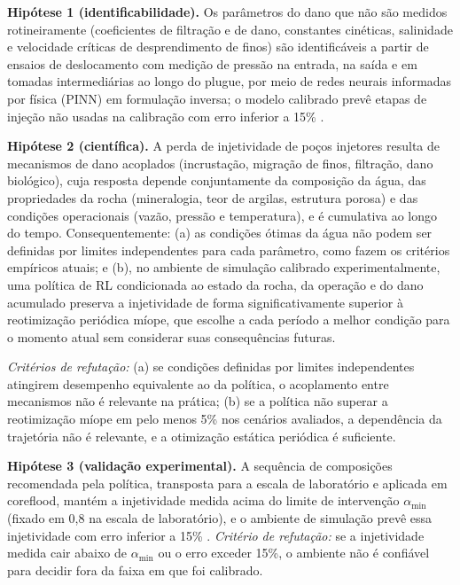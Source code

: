 \documentclass[10pt,a4paper]{article}
\begin{document}
\textbf{Hipótese 1 (identificabilidade).} Os parâmetros do dano que não são medidos rotineiramente
(coeficientes de filtração e de dano, constantes cinéticas, salinidade e velocidade
críticas de desprendimento de finos) são identificáveis a partir de ensaios de
deslocamento com medição de pressão na entrada, na saída e em tomadas intermediárias ao
longo do plugue, por meio de redes neurais informadas por física (PINN) em formulação inversa; o modelo
calibrado prevê etapas de injeção não usadas na calibração com erro inferior a 15\% \cite{bulau1997}.

\textbf{Hipótese 2 (científica).} A perda de injetividade de poços injetores resulta de mecanismos de dano
acoplados (incrustação, migração de finos, filtração, dano biológico), cuja resposta depende
conjuntamente da composição da água, das propriedades da rocha (mineralogia, teor de
argilas, estrutura porosa) e das condições operacionais (vazão, pressão e temperatura), e
é cumulativa ao longo do tempo. Consequentemente: (a) as condições ótimas da água não
podem ser definidas por limites independentes para cada parâmetro, como fazem os
critérios empíricos atuais; e (b), no ambiente de simulação calibrado experimentalmente, uma política de RL condicionada ao estado da rocha, da
operação e do dano acumulado preserva a injetividade de forma significativamente
superior à reotimização periódica míope, que escolhe a cada período a melhor condição
para o momento atual sem considerar suas consequências futuras.

\textit{Critérios de refutação:} (a) se condições definidas por limites independentes
atingirem desempenho equivalente ao da política, o acoplamento entre mecanismos não é
relevante na prática; (b) se a política não superar a reotimização míope em pelo menos
5\% \cite{jansen2009clrm} nos cenários avaliados, a dependência da trajetória não é
relevante, e a otimização estática periódica é suficiente.

\textbf{Hipótese 3 (validação experimental).} A sequência de composições recomendada pela
política, transposta para a escala de laboratório e aplicada em coreflood, mantém a
injetividade medida acima do limite de intervenção $\alpha_{\min}$ (fixado em 0,8 na escala de laboratório), e o ambiente de simulação
prevê essa injetividade com erro inferior a 15\% \cite{bulau1997}. \textit{Critério de
refutação:} se a injetividade medida cair abaixo de $\alpha_{\min}$ ou o erro exceder 15\%, o
ambiente não é confiável para decidir fora da faixa em que foi calibrado.
\end{document}
